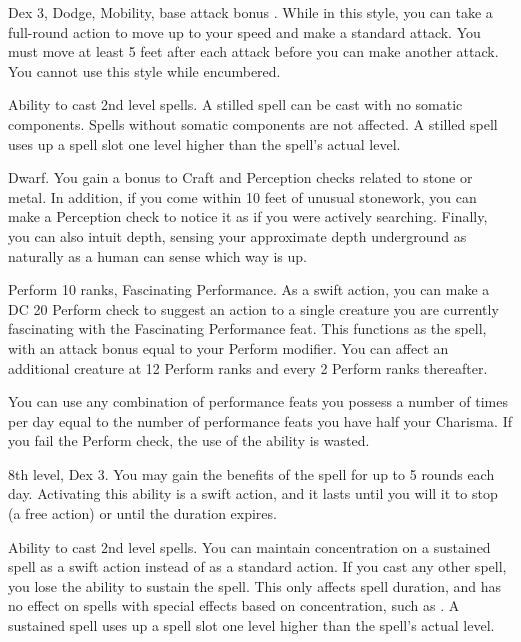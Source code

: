  Dex 3, Dodge, Mobility, base attack bonus .
 While in this style, you can take a full-round action to move up to your speed and make a standard attack. You must move at least 5 feet after each attack before you can make another attack. You cannot use this style while encumbered.

 Ability to cast 2nd level spells.
 A stilled spell can be cast with no somatic components. Spells without somatic components are not affected. A stilled spell uses up a spell slot one level higher than the spell's actual level.

 Dwarf.
 You gain a  bonus to Craft and Perception checks related to stone or metal. In addition, if you come within 10 feet of unusual stonework, you can make a Perception check to notice it as if you were actively searching. Finally, you can also intuit depth, sensing your approximate depth underground as naturally as a human can sense which way is up.

\featpre Perform 10 ranks, Fascinating Performance.
\featben As a swift action, you can make a DC 20 Perform check to suggest an action to a single creature you are currently fascinating with the Fascinating Performance feat. This functions as the  spell, with an attack bonus equal to your Perform modifier. You can affect an additional creature at 12 Perform ranks and every 2 Perform ranks thereafter.

You can use any combination of performance feats you possess a number of times per day equal to the number of performance feats you have \add half your Charisma. If you fail the Perform check, the use of the ability is wasted.

\featpre 8th level, Dex 3.
\featben You may gain the benefits of the  spell for up to 5 rounds each day. Activating this ability is a swift action, and it lasts until you will it to stop (a free action) or until the duration expires.

\featpre Ability to cast 2nd level spells.
\featben You can maintain concentration on a sustained spell as a swift action instead of as a standard action. If you cast any other spell, you lose the ability to sustain the spell. This only affects spell duration, and has no effect on spells with special effects based on concentration, such as . A sustained spell uses up a spell slot one level higher than the spell's actual level.

